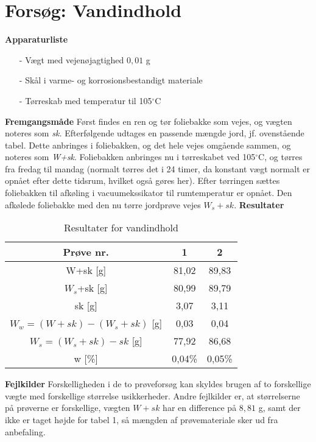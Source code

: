 \chapter{Forsøg: Vandindhold}

\textbf{Apparaturliste}
\begin{itemize}
\item[-] Vægt med vejenøjagtighed $0,\!01$ g
\item[-] Skål i varme- og korrosionsbestandigt materiale
\item[-] Tørreskab med temperatur til 105$^{\circ}$C
\end{itemize}

\textbf{Fremgangsmåde}
\newline
Først findes en ren og tør foliebakke som vejes, og vægten noteres som \textit{sk.} Efterfølgende udtages en passende mængde jord, jf. ovenstående tabel. Dette anbringes i foliebakken, og det hele vejes omgående sammen, og noteres som \textit{W+sk}.
\newline \indent{     }  Foliebakken anbringes nu i tørreskabet ved 105$^{\circ}$C, og tørres fra fredag til mandag (normalt tørres det i 24 timer, da konstant vægt normalt er opnået efter dette tidsrum, hvilket også gøres her). Efter tørringen sættes foliebakken til afkøling i vacuumekssikator til rumtemperatur er opnået. Den afkølede foliebakke med den nu tørre jordprøve vejes \textit{$W_{s}+sk$}.
\newline
\newline
\textbf{Resultater}
\begin{table}
\begin{center}
	\begin{tabular}{ |c|c|c| } 
		\hline
		Prøve nr. & 1 & 2 \\	\hline
		W+sk [g] & 81,02 & 89,83 \\	\hline
		$W_s$+sk [g] & 80,99 & 89,79 \\	\hline 
		sk [g] & 3,07 & 3,11 \\ \hline
		$W_w=(W+sk) - (W_s+sk)$ [g] & 0,03 & 0,04 \\	\hline
		$W_s=(W_s+sk) - sk$ [g] & 77,92 & 86,68 \\	\hline		
		w [\%] & 0,04\% & 0,05\% \\	\hline	
	\end{tabular}
	\caption{Resultater for vandindhold}
	\label{tab:bilaga1}
\end{center}
\end{table}

\textbf{Fejlkilder}
\newline
Forskelligheden i de to prøveforsøg kan skyldes brugen af to forskellige vægte med forskellige størrelse usikkerheder. Andre fejlkilder er, at størrelserne på prøverne er forskellige, vægten $W+sk$ har en difference på $8,\!81$ g, samt der ikke er taget højde for tabel 1, så mængden af prøvemateriale sker ud fra anbefaling.